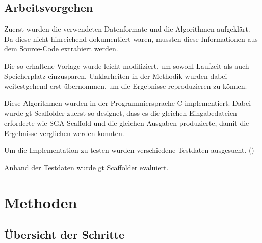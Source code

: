 \documentclass[a4paper,10pt,parskip]{scrartcl}
\begin{document}
\subsection{Arbeitsvorgehen}
Zuerst wurden die verwendeten Datenformate und die Algorithmen
aufgeklärt. Da diese nicht hinreichend dokumentiert waren, mussten
diese Informationen aus dem Source-Code extrahiert werden.

Die so erhaltene Vorlage wurde leicht modifiziert, um sowohl Laufzeit
als auch Speicherplatz einzusparen. Unklarheiten in der Methodik wurden
dabei weitestgehend erst übernommen, um die Ergebnisse reproduzieren
zu können.

Diese Algorithmen wurden in der Programmiersprache C
implementiert. Dabei wurde gt Scaffolder zuerst so designet, dass es
die gleichen Eingabedateien erforderte wie SGA-Scaffold und die
gleichen Ausgaben produzierte, damit die Ergebnisse verglichen werden
konnten.

Um die Implementation zu testen wurden verschiedene Testdaten
ausgesucht. ()

Anhand der Testdaten wurde gt Scaffolder evaluiert.

\section{Methoden}
\label{sec: Methoden}
\subsection{Übersicht der Schritte}
\end{document}
